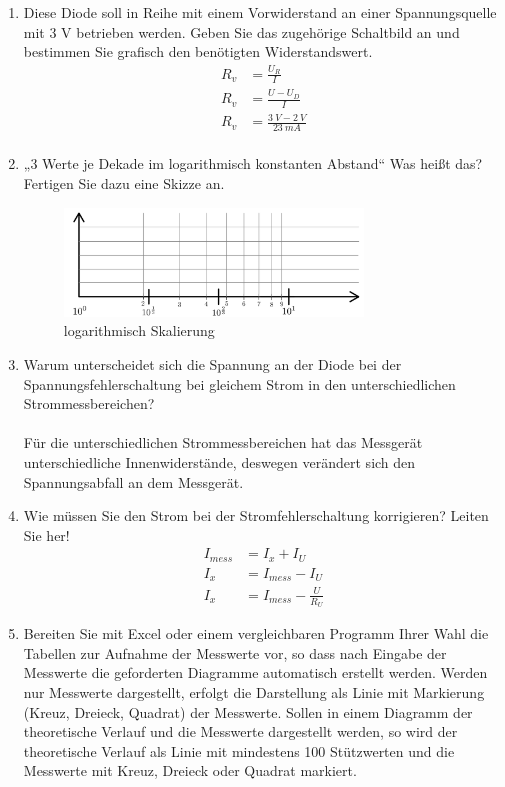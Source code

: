 \begin{enumerate}[label=\alph*)]
	\item Diese Diode soll in Reihe mit einem Vorwiderstand an einer Spannungsquelle mit 3 V betrieben werden. Geben Sie das zugehörige Schaltbild an und bestimmen Sie grafisch den benötigten Widerstandswert.
    \begin{align*}
      R_v &= \frac{U_R}{I}\\
      R_v &= \frac{U - U_D}{I}\\
      R_v &= \frac{3\ V - 2\ V}{23\ mA}\\
    \end{align*}
	\item „3 Werte je Dekade im logarithmisch konstanten Abstand“ Was heißt das? Fertigen Sie dazu eine Skizze an.
    \begin{figure}[h!]
      \begin{center}
        \includegraphics[width=0.75\textwidth]{img/2.1.4.1}
      \end{center}
      \caption{logarithmisch Skalierung}\label{img:2.1.4.1}
    \end{figure}
    
	\item Warum unterscheidet sich die Spannung an der Diode bei der Spannungsfehlerschaltung bei gleichem Strom in den unterschiedlichen Strommessbereichen?\\\ \\
    Für die unterschiedlichen Strommessbereichen hat das Messgerät unterschiedliche Innenwiderstände, deswegen verändert sich den Spannungsabfall an dem Messgerät.
	\item Wie müssen Sie den Strom bei der Stromfehlerschaltung korrigieren? Leiten Sie her!
    \begin{align*}
      I_{mess} &= I_x + I_U\\ 
      I_x &= I_{mess} - I_U\\ 
      I_x &= I_{mess} - \frac{U}{R_U}
    \end{align*}
	\item Bereiten Sie mit Excel oder einem vergleichbaren Programm Ihrer Wahl die Tabellen zur Aufnahme der Messwerte vor, so dass nach Eingabe der Messwerte die geforderten Diagramme automatisch erstellt werden. Werden nur Messwerte dargestellt, erfolgt die Darstellung als Linie mit Markierung (Kreuz, Dreieck, Quadrat) der Messwerte. Sollen in einem Diagramm der theoretische Verlauf und die Messwerte dargestellt werden, so wird der theoretische Verlauf als Linie mit mindestens 100 Stützwerten und die Messwerte mit Kreuz, Dreieck oder Quadrat markiert.
\end{enumerate}

